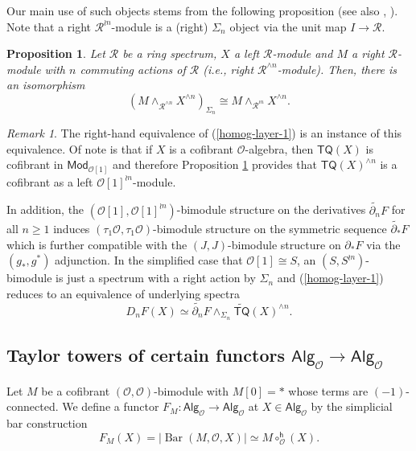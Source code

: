 \documentclass[11pt]{amsart}
\newtheorem{proposition}[subsection]{Proposition}
\theoremstyle{definition}
\theoremstyle{remark}
\newtheorem{remark}[subsection]{Remark}
\newcommand{\TQ}{\mathsf{TQ}}
\newcommand{\Alg}[1]{ {\mathsf{Alg}_{\mathcal{#1}}} }
\newcommand{\Barr}{\operatorname{Bar}}
\newcommand{\pt}{*}
\newcommand{\Cal}[1]{\mathcal{#1}}
\begin{document}
Our main use of such objects stems from the following proposition (see also \cite[Lemma 14]{Law-1}, \cite[]{KuhPer}). Note that a right $\Cal{R}^{\wr n}$-module is a (right) $\Sigma_n$ object via the unit map $I\to \Cal{R}$. 

\begin{proposition} \label{eq:wreath-product-coeq}
    Let $\Cal{R}$ be a ring spectrum, $X$ a left $\Cal{R}$-module and $M$ a right $\Cal{R}$-module with $n$ commuting actions of $\Cal{R}$ (i.e., right $\Cal{R}^{\wedge n}$-module). Then, there is an isomorphism \begin{equation*} 
        (M \wedge_{\Cal{R}^{\wedge n}} X^{\wedge n})_{\Sigma_n}\cong M\wedge_{\Cal{R}^{\wr n}} X^{\wedge n}.
    \end{equation*}
\end{proposition}


\begin{remark}The right-hand equivalence of (\ref{homog-layer-1}) is an instance of this equivalence. Of note is that if $X$ is a cofibrant $\Cal{O}$-algebra, then $\TQ(X)$ is cofibrant in $\mathsf{Mod}_{\Cal{O}[1]}$ and therefore Proposition \ref{eq:wreath-product-coeq} provides that $\TQ(X)^{\wedge n}$ is a cofibrant as a left $\Cal{O}[1]^{\wr n}$-module. 
\end{remark}

In addition, the $(\Cal{O}[1], \Cal{O}[1]^{\wr n})$-bimodule structure on the derivatives $\widetilde{\partial_n} F$ for all $n\geq 1$ induces $(\tau_1\Cal{O}, \tau_1\Cal{O})$-bimodule structure on the symmetric sequence $\widetilde{\partial_*} F$ which is further compatible with the $(J,J)$-bimodule structure on $\partial_*F$ via the $(g_*,g^*)$ adjunction. In the simplified case that $\Cal{O}[1]\cong S$, an $(S,S^{\wr n})$-bimodule is just a spectrum with a right action by $\Sigma_n$ and (\ref{homog-layer-1}) reduces to an equivalence of underlying spectra \[D_n F(X)\simeq \widetilde{\partial_n}F\wedge_{\Sigma_n} \widetilde{\TQ}(X)^{\wedge n}.\]

\subsection{Taylor towers of certain functors $\Alg{O}\to \Alg{O}$}
Let $M$ be a cofibrant $(\Cal{O}, \Cal{O})$-bimodule with $M[0]=\pt$ whose terms are $(-1)$-connected. We define a functor $F_M\colon \Alg{O}\to \Alg{O}$ at $X\in \Alg{O}$ by the simplicial bar construction \begin{equation} 
    F_M(X) = |\Barr(M,\Cal{O},X)| \simeq M \circ^{\mathsf{h}}_{\Cal{O}}(X).\end{equation}
\end{document}

